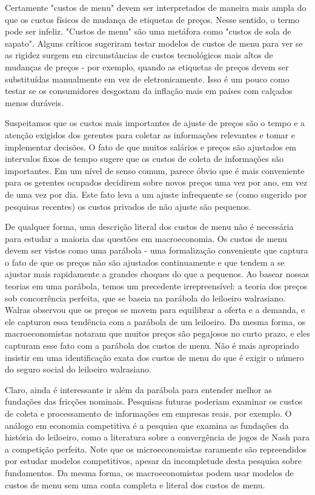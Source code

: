 \documentclass[12pt]{article}
\begin{document}
Certamente "custos de menu" devem ser interpretados de maneira mais ampla do que os custos físicos de mudança de etiquetas de preços. Nesse sentido, o termo pode ser infeliz. "Custos de menu" são uma metáfora como "custos de sola de sapato". Alguns críticos sugeriram testar modelos de custos de menu para ver se as rigidez surgem em circunstâncias de custos tecnológicos mais altos de mudanças de preços - por exemplo, quando as etiquetas de preços devem ser substituídas manualmente em vez de eletronicamente. Isso é um pouco como testar se os consumidores desgostam da inflação mais em países com calçados menos duráveis.

Suspeitamos que os custos mais importantes de ajuste de preços são o tempo e a atenção exigidos dos gerentes para coletar as informações relevantes e tomar e implementar decisões. O fato de que muitos salários e preços são ajustados em intervalos fixos de tempo sugere que os custos de coleta de informações são importantes. Em um nível de senso comum, parece óbvio que é mais conveniente para os gerentes ocupados decidirem sobre novos preços uma vez por ano, em vez de uma vez por dia. Este fato leva a um ajuste infrequente se (como sugerido por pesquisas recentes) os custos privados de não ajuste são pequenos.

De qualquer forma, uma descrição literal dos custos de menu não é necessária para estudar a maioria das questões em macroeconomia. Os custos de menu devem ser vistos como uma parábola - uma formalização conveniente que captura o fato de que os preços não são ajustados continuamente e que tendem a se ajustar mais rapidamente a grandes choques do que a pequenos. Ao basear nossas teorias em uma parábola, temos um precedente irrepreensível: a teoria dos preços sob concorrência perfeita, que se baseia na parábola do leiloeiro walrasiano. Walras observou que os preços se movem para equilibrar a oferta e a demanda, e ele capturou essa tendência com a parábola de um leiloeiro. Da mesma forma, os macroeconomistas notaram que muitos preços são pegajosos no curto prazo, e eles capturam esse fato com a parábola dos custos de menu. Não é mais apropriado insistir em uma identificação exata dos custos de menu do que é exigir o número do seguro social do leiloeiro walrasiano.

Claro, ainda é interessante ir além da parábola para entender melhor as fundações das fricções nominais. Pesquisas futuras poderiam examinar os custos de coleta e processamento de informações em empresas reais, por exemplo. O análogo em economia competitiva é a pesquisa que examina as fundações da história do leiloeiro, como a literatura sobre a convergência de jogos de Nash para a competição perfeita. Note que os microeconomistas raramente são repreendidos por estudar modelos competitivos, apesar da incompletude desta pesquisa sobre fundamentos. Da mesma forma, os macroeconomistas podem usar modelos de custos de menu sem uma conta completa e literal dos custos de menu.
\end{document}
